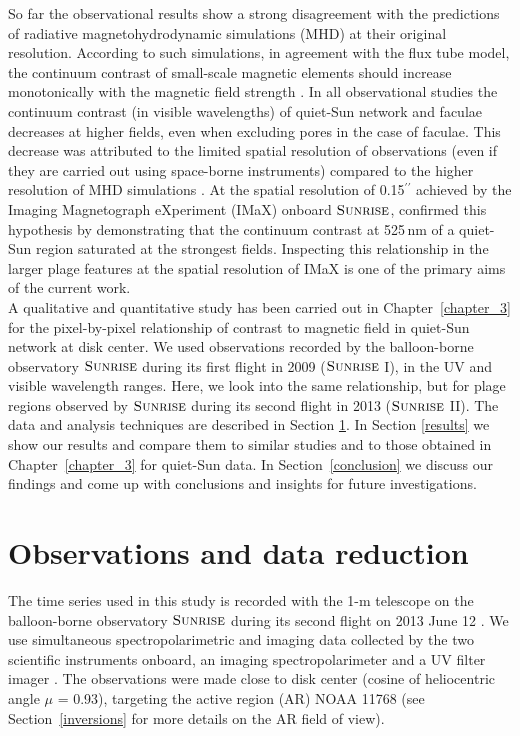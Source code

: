 \documentclass[goettingen, gauss, print]{thesis}
\begin{document}
So far the observational results show a strong disagreement with the predictions of radiative magnetohydrodynamic simulations (MHD) at their original resolution. According to such simulations, in agreement with  the flux tube model, the continuum contrast of small-scale magnetic elements should increase monotonically with the magnetic field strength \citep[][their Fig.~13]{vogler_simulations_2005}. In all observational studies the continuum contrast (in visible wavelengths) of quiet-Sun network and faculae decreases at higher fields, even when excluding pores in the case of faculae. This decrease was attributed to the limited spatial resolution of observations (even if they are carried out using space-borne instruments) compared to the higher resolution of MHD simulations \citep[]{rohrbein_is_2011,danilovic_relation_2013}. At the spatial resolution of 0.15$^{\prime\prime}$ achieved by the Imaging Magnetograph eXperiment (IMaX) onboard $\textsc{Sunrise}$, \cite{kahil_brightness_2017} confirmed this hypothesis by demonstrating that the continuum contrast at 525\,nm of a quiet-Sun region saturated at the strongest fields. Inspecting this relationship in the larger plage features at the spatial resolution of IMaX is one of the primary aims of the current work. \\

A qualitative and quantitative study has been carried out in Chapter~\ref{chapter_3} for the pixel-by-pixel relationship of contrast to magnetic field in quiet-Sun network at disk center. We used observations recorded by the balloon-borne observatory $\textsc{Sunrise}$ during its first flight in 2009 ($\textsc{Sunrise}$ I), in the UV and visible wavelength ranges. Here, we look into the same relationship, but for plage regions observed by $\textsc{Sunrise}$ during its second flight in 2013 ($\textsc{Sunrise}$ II).  
The data and analysis techniques are described in Section \ref{observations}. In Section \ref{results} we show our results and compare them to similar studies and to those obtained in Chapter~\ref{chapter_3} for quiet-Sun data. In Section~\ref{conclusion} we discuss our findings and come up with conclusions and insights for future investigations.  


\section{Observations and data reduction}
\label{observations}
The time series used in this study is recorded with the 1-m telescope on the balloon-borne observatory $\textsc{Sunrise}$ \citep{solanki_sunrise:_2010,barthol_sunrise_2011,berkefeld_wave-front_2011} during its second flight on 2013 June 12 \citep{solanki_second_2017}. We use simultaneous spectropolarimetric and imaging data collected by the two scientific instruments onboard, an imaging spectropolarimeter \citep[IMaX;][]{martinezpillet_imaging_2011} and a UV filter imager \citep[SuFI;][]{gandorfer_filter_2011}. The observations were made close to disk center (cosine of heliocentric angle $\mu$ = 0.93), targeting the active region (AR) NOAA 11768 (see Section~\ref{inversions} for more details on the AR field of view). 
\end{document}
